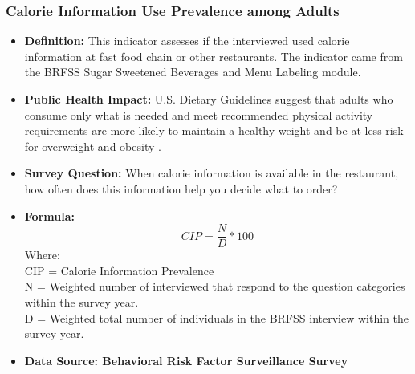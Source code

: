 \documentclass[12pt,letterpaper]{report}
\begin{document}
		\subsubsection{Calorie Information Use Prevalence among Adults} 
	\begin{itemize}
		\item \textbf{Definition:} This indicator assesses if the interviewed used calorie information at fast food chain or other restaurants.  The indicator came from the BRFSS Sugar Sweetened Beverages and Menu Labeling module.
		\item \textbf{Public Health Impact:} U.S. Dietary Guidelines suggest that adults who consume only what is needed and meet recommended physical activity requirements are more likely to maintain a healthy weight and be at less risk for overweight and obesity \cite{DietaryGuidelines2010}.
		\item \textbf{Survey Question:} When calorie information is available in the restaurant, how often does this information help you decide what to order?
		\item \textbf{Formula:} 
			\begin{equation}
				CIP = \frac{N}{D} *100
			\end{equation}
Where: \\
			CIP = Calorie Information Prevalence \\
			
			N = Weighted number of interviewed that respond to the question categories within the survey year.\\
			
			D = Weighted total number of individuals in the BRFSS interview within the survey year. \\
			
		\item \textbf{Data Source: Behavioral Risk Factor Surveillance Survey}
	\end{itemize}
	
\end{document}
